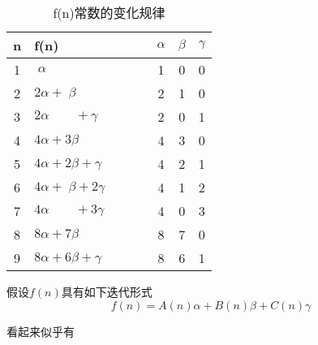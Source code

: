 \begin{table}[htbp]
	\centering
	\small
	\caption{f(n)常数的变化规律}
	\begin{tabular}{c|lcccc}
	\toprule
	n & f(n) & $ \qquad $ & $ \alpha $ & $ \beta $ & $ \gamma $ \\
	\midrule
	1 & $ \;\alpha $                    && 1& 0 &0 \\
	2 & $ 2\alpha + \;\beta $           && 2& 1 &0 \\
	3 & $ 2\alpha \qquad + \gamma $     && 2& 0 &1 \\ 
	4 & $ 4\alpha + 3\beta $            && 4& 3 &0 \\ 
	5 & $ 4\alpha + 2\beta  + \gamma $  && 4& 2 &1 \\ 
	6 & $ 4\alpha + \;\beta + 2\gamma $ && 4& 1 &2 \\ 
	7 & $ 4\alpha \qquad + 3\gamma $    && 4& 0 &3 \\ 
	8 & $ 8\alpha + 7\beta $            && 8& 7 &0 \\ 
	9 & $ 8\alpha + 6\beta + \gamma $   && 8& 6 &1 \\ 
	\bottomrule
\end{tabular}%
	\label{tab:fnLists}%
\end{table}%

假设$ f(n) $具有如下迭代形式
\begin{equation}\label{fnReccu}
	f(n) = A(n)\alpha + B(n)\beta + C(n)\gamma
\end{equation}

看起来似乎有


